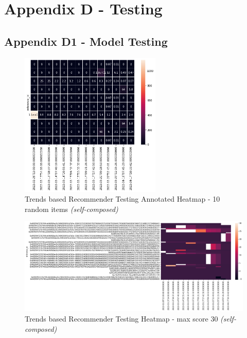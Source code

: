 \chapter{Appendix D - Testing}
\label{appendix:testing}

\section*{Appendix D1 - Model Testing}

\begin{figure}[h!]
\centering
\includegraphics[width=0.6\textwidth]{images/Testing/trends/trends-heatmap-10-rand-annot.png}
\caption{Trends based Recommender Testing Annotated Heatmap - 10 random items \textit{(self-composed)}}
\label{fig:trends-recsys-heatmap-10-anot}
\end{figure}

\begin{figure}[h!]
\centering
\includegraphics[width=\textwidth]{images/Testing/trends/trends-heatmap-30-labeled.png}
\caption{Trends based Recommender Testing Heatmap - max score 30 \textit{(self-composed)}}
\label{fig:trends-recsys-heatmap-30-labeled}
\end{figure}

